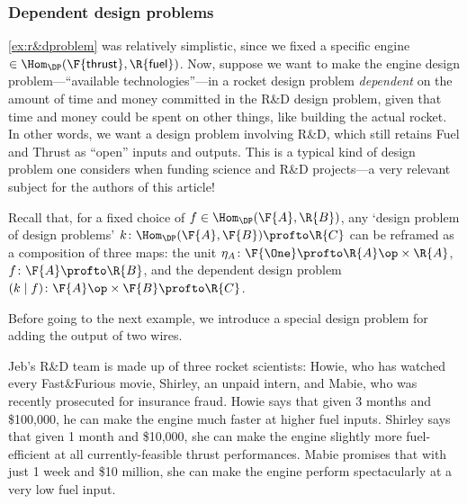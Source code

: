 \subsubsection{Dependent design problems}
\cref{ex:r&dproblem} was relatively simplistic, since we fixed a specific engine $\in \Hom_\DP(\F{\mathsf{thrust}}, \R{\mathsf{fuel}})$. Now, suppose we want to make the engine design problem---``available technologies''---in a rocket design problem \emph{dependent} on the amount of time and money committed in the R\&D design problem, given that time and money could be spent on other things, like building the actual rocket. In other words, we want a design problem involving R\&D, which still retains Fuel and Thrust as ``open'' inputs and outputs. This is a typical kind of design problem one considers when funding science and R\&D projects---a very relevant subject for the authors of this article!

Recall that, for a fixed choice of $f \in \Hom_\DP(\F{A},\R{B})$, any `design problem of design problems' $k \colon \Hom_\DP(\F{A},\F{B}) \profto \R{C}$ can be reframed as a composition of three maps: the unit $\eta_A \colon \F{\One} \profto \R{A}\op \times \R{A}$, $f \colon \F{A} \profto \R{B}$, and the dependent design problem $(k \mid f) \colon \F{A}\op \times \F{B} \profto \R{C}$.


Before going to the next example, we introduce a special design problem for adding the output of two wires.


\begin{example}
Jeb's R\&D team is made up of three rocket scientists: Howie, who has watched every Fast\&Furious movie, Shirley, an unpaid intern, and Mabie, who was recently prosecuted for insurance fraud. Howie says that given 3 months and \$100,000, he can make the engine much faster at higher fuel inputs. Shirley says that given 1 month and \$10,000, she can make the engine slightly more fuel-efficient at all currently-feasible thrust performances. Mabie promises that with just 1 week and \$10 million, she can make the engine perform spectacularly at a very low fuel input.
\end{example}

